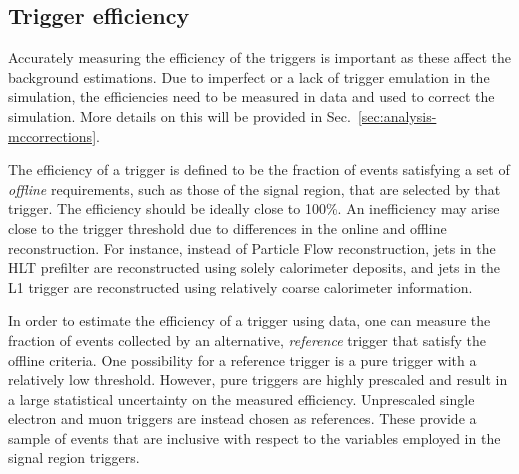

\subsection{Trigger efficiency}

Accurately measuring the efficiency of the triggers is important as these 
affect the background estimations. Due to imperfect or a lack of trigger 
emulation in the simulation, the efficiencies need to be measured in data and 
used to correct the simulation. More details on this will be provided in 
Sec.~\ref{sec:analysis-mccorrections}. 

The efficiency of a trigger is defined to be the fraction of events satisfying 
a set of \textit{offline} requirements, such as those of the signal region, 
that are selected by that trigger. The efficiency should be ideally close to 
100\%. An inefficiency may arise close to the trigger threshold due to 
differences in the online and offline reconstruction. For instance, instead of 
Particle Flow reconstruction, jets in the HLT prefilter are reconstructed using 
solely calorimeter deposits, and jets in the L1 trigger are reconstructed using 
relatively coarse calorimeter information.

In order to estimate the efficiency of a trigger using data, one can 
measure the fraction of events collected by an alternative, \textit{reference} 
trigger that satisfy the offline criteria. One possibility for a reference 
trigger is a pure \scalht trigger with a relatively low threshold. However, 
pure \scalht triggers are highly prescaled and result in a large statistical 
uncertainty on the measured efficiency. Unprescaled single electron and muon 
triggers are instead chosen as references. These provide a sample of events 
that are inclusive with respect to the variables employed in the signal region 
triggers.

